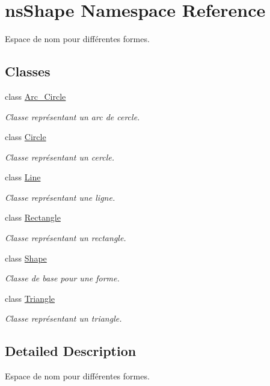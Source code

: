 \hypertarget{namespacens_shape}{}\section{ns\+Shape Namespace Reference}
\label{namespacens_shape}


Espace de nom pour différentes formes.  


\subsection*{Classes}
\begin{DoxyCompactItemize}
\item 
class \hyperlink{classns_shape_1_1_arc___circle}{Arc\+\_\+\+Circle}
\begin{DoxyCompactList}\small\item\em Classe représentant un arc de cercle. \end{DoxyCompactList}\item 
class \hyperlink{classns_shape_1_1_circle}{Circle}
\begin{DoxyCompactList}\small\item\em Classe représentant un cercle. \end{DoxyCompactList}\item 
class \hyperlink{classns_shape_1_1_line}{Line}
\begin{DoxyCompactList}\small\item\em Classe représentant une ligne. \end{DoxyCompactList}\item 
class \hyperlink{classns_shape_1_1_rectangle}{Rectangle}
\begin{DoxyCompactList}\small\item\em Classe représentant un rectangle. \end{DoxyCompactList}\item 
class \hyperlink{classns_shape_1_1_shape}{Shape}
\begin{DoxyCompactList}\small\item\em Classe de base pour une forme. \end{DoxyCompactList}\item 
class \hyperlink{classns_shape_1_1_triangle}{Triangle}
\begin{DoxyCompactList}\small\item\em Classe représentant un triangle. \end{DoxyCompactList}\end{DoxyCompactItemize}


\subsection{Detailed Description}
Espace de nom pour différentes formes. 